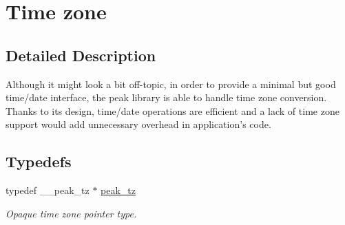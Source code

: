 \hypertarget{group__tz}{
\section{Time zone}
\label{group__tz}
}


\subsection{Detailed Description}
Although it might look a bit off-topic, in order to provide a minimal but good time/date interface, the peak library is able to handle time zone conversion. Thanks to its design, time/date operations are efficient and a lack of time zone support would add unnecessary overhead in application's code. 

\subsection*{Typedefs}
\begin{CompactItemize}
\item 
\hypertarget{group__tz_ga0}{
typedef \_\-\_\-peak\_\-tz $\ast$ \hyperlink{group__tz_ga0}{peak\_\-tz}}
\label{group__tz_ga0}

\begin{CompactList}\small\item\em Opaque time zone pointer type. \item\end{CompactList}\end{CompactItemize}
